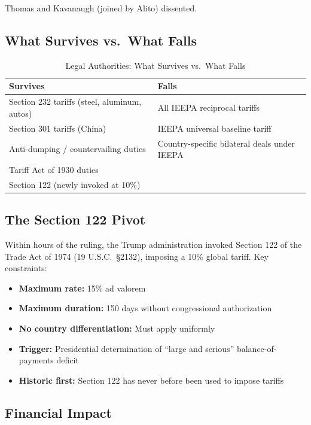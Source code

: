\documentclass[12pt,a4paper]{article}
\begin{document}
Thomas and Kavanaugh (joined by Alito) dissented.

\subsection{What Survives vs.\ What Falls}

\begin{table}[htbp]
\centering
\caption{Legal Authorities: What Survives vs.\ What Falls}
\begin{tabularx}{\textwidth}{XX}
\toprule
\textbf{Survives} & \textbf{Falls} \\
\midrule
Section 232 tariffs (steel, aluminum, autos) & All IEEPA reciprocal tariffs \\
Section 301 tariffs (China) & IEEPA universal baseline tariff \\
Anti-dumping / countervailing duties & Country-specific bilateral deals under IEEPA \\
Tariff Act of 1930 duties & \\
Section 122 (newly invoked at 10\%) & \\
\bottomrule
\end{tabularx}
\end{table}

\subsection{The Section 122 Pivot}

Within hours of the ruling, the Trump administration invoked Section 122 of the Trade Act of 1974 (19 U.S.C.\ \S 2132), imposing a 10\% global tariff. Key constraints:

\begin{itemize}
    \item \textbf{Maximum rate:} 15\% ad valorem
    \item \textbf{Maximum duration:} 150 days without congressional authorization
    \item \textbf{No country differentiation:} Must apply uniformly
    \item \textbf{Trigger:} Presidential determination of ``large and serious'' balance-of-payments deficit
    \item \textbf{Historic first:} Section 122 has never before been used to impose tariffs
\end{itemize}

\subsection{Financial Impact}
\end{document}
